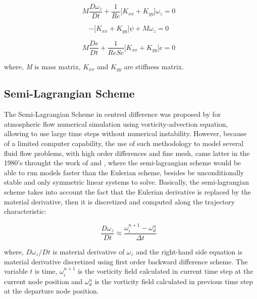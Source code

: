 \documentclass[10pt,fleqn,a4paper,twoside]{article}
\begin{document}
\vspace{-0.4cm}
\begin{equation}
 M \frac{D \omega_{z}}{Dt} 
 + \frac{1}{\textit{Re}} \Big[ K_{xx} + K_{yy} \Big] \omega_{z}
 = 0 \label{vorticity matrix}
\end{equation}

\vspace{-0.65cm}
\begin{equation}
 - \Big[ K_{xx} + K_{yy} \Big] \psi + M \omega_{z} = 0 \label{stream matrix}
\end{equation}

\vspace{-0.65cm}
\begin{equation}
 M \frac{De}{Dt} 
 + \frac{1}{\textit{ReSc}} \Big[ K_{xx} + K_{yy} \Big] e
 = 0 \label{concentration matrix}
\end{equation}



\noindent
where,
\textit{M} is mass matrix,
\textit{$K_{xx}$} and
\textit{$K_{yy}$} are stiffness matrix.



\subsection{Semi-Lagrangian Scheme}
The Semi-Lagrangian Scheme in centred difference was proposed by \cite{sawyer1963} for atmospheric flow numerical simulation using vorticity-advection equation, allowing to use large time steps without numerical instability. 
However, because of a limited computer capability, the use of such methodology to model several fluid flow problems, with high order differences and fine mesh, came latter in the 1980's throught the work of \cite{robert1981} and \cite{pironneau1982}, where the semi-lagrangian scheme would be able to run models faster than the Eulerian scheme, besides be unconditionally stable and only symmetric linear systems to solve. 
Basically, the semi-lagrangian scheme takes into account the fact that the Eulerian derivative is replaced by the material derivative, then it is discretized and computed along the trajectory characteristic:

\vspace{-0.4cm}
\begin{equation}
 \frac{D \omega_{z}}{D t} \approx
 \frac{\omega_{i}^{n+1} - \omega_{d}^{n}}{\Delta t}
\end{equation}

\noindent
where, 
$D\omega_{z}/Dt$ is material derivative of $\omega_{z}$ and
the right-hand side equation is material derivative discretized using first order backward difference scheme.
The variable $t$ is time, 
$\omega_{i}^{n+1}$ is the vorticity field calculated in current time step at the current node position and
$\omega_{d}^{n}$ is the vorticity field calculated in previous time step at the departure node position.
\end{document}

